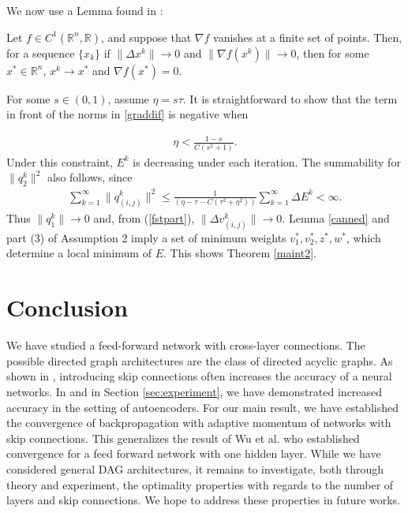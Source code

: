 \documentclass{jcmlatex}
\begin{document}
We now use a Lemma found in  \cite{sun2006}:

\begin{lemma}\label{canned}
Let $f \in C^1( \mathbb R^n, \mathbb R)$, and suppose that  $\nabla f$ vanishes
at a finite set of points.  Then, for a sequence $\{x_k\}$ if $\|\Delta x^k\|
\rightarrow 0$ and $\|\nabla f(x^k)\|\rightarrow 0$, then for some $x^* \in
\mathbb R^n$,  $x^k \rightarrow x^*$ and $\nabla f(x^*) = 0$.
\end{lemma}

For some $s \in (0,1)$, assume $\eta = s\tau $.  It is straightforward to show that the term in
front of the norms in \ref{graddif} is negative when

\begin{align}
\eta < \frac{1-s}{C(s^2+1)}.
\end{align}
Under this constraint, $E^k$ is decreasing under each iteration. The summability
for $\|q_{2}^k\|^2$ also follows, since
\begin{align}
\sum_{k = 1}^\infty \|q_{(i,j)}^k\|^2 \le\frac 1{\left(\eta-\tau- C(\tau^2+\eta^2)\right)}
\sum_{k = 1}^\infty \Delta E^k <\infty.
\end{align}
Thus  $\|q_{1}^k\|\rightarrow 0$ and, from (\ref{fstpart}),  $ \|\Delta v_{(i,j)}^k\|\rightarrow 0.$
Lemma \ref{canned}
and part (3) of Assumption 2 imply a set of minimum weights $v^*_{1}, v_2^*, z^*, w^*$,
which determine a local minimum of $E$. This shows Theorem \ref{maint2}.

\section{Conclusion}
We have studied a feed-forward network with cross-layer connections. The possible directed graph architectures are the class of directed acyclic graphs.  As shown in \cite{huang2016densely}, introducing skip connections often increases the accuracy of a neural networks. In \cite{agarwal2018crossencoder} and in Section \ref{sec:experiment}, we have demonstrated increased accuracy in the setting of autoencoders. For our main result, we have established the convergence of backpropagation with adaptive momentum of networks with skip connections. This generalizes the result of Wu et al. \cite{wu2008convergence} who established convergence for a feed forward network with one hidden layer. While we have considered general DAG architectures, it remains to investigate, both through theory and experiment, the optimality properties with regards to the number of layers and  skip connections. We hope to address these properties in future works.



\end{document}
